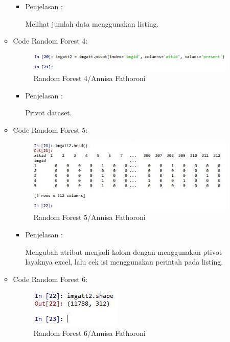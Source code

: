 \begin{enumerate}
\begin{itemize}
\begin{itemize}
\item Penjelasan :

Melihat jumlah data menggunakan listing.

\end{itemize}
\item Code Random Forest 4:

\begin{figure}[ht]
\centering
\includegraphics[scale=0.6]{figures/Chapter3AnnisaFathoroni13.jpg}
\caption{Random Forest 4/Annisa Fathoroni}
\label{contoh}
\end{figure}

\begin{itemize}
\item Penjelasan :

Privot dataset.

\end{itemize}
\item Code Random Forest 5:

\begin{figure}[ht]
\centering
\includegraphics[scale=0.6]{figures/Chapter3AnnisaFathoroni14.jpg}
\caption{Random Forest 5/Annisa Fathoroni}
\label{contoh}
\end{figure}

\begin{itemize}
\item Penjelasan :

Mengubah atribut menjadi kolom dengan menggunakan ptivot layaknya excel, lalu cek isi menggunakan perintah pada listing.

\end{itemize}
\item Code Random Forest 6:

\begin{figure}[ht]
\centering
\includegraphics[scale=0.6]{figures/Chapter3AnnisaFathoroni15.jpg}
\caption{Random Forest 6/Annisa Fathoroni}
\label{contoh}
\end{figure}


\end{itemize}
\end{enumerate}
